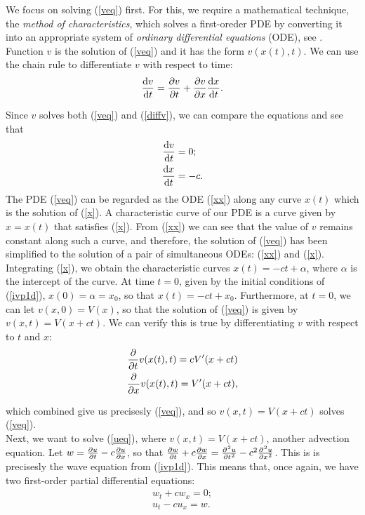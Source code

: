 \documentclass[a4paper, 12pt]{article}
\numberwithin{equation}{section}
\begin{document}
We focus on solving (\ref{veq}) first. For this, we require a mathematical
technique, the \emph{method of characteristics}, which solves a first-oreder PDE by
converting it into an appropriate system of \emph{ordinary differential equations}
(ODE), see \cite[Ch. 2.1, Ch. 3.2]{Ev}. Function $v$ is the solution of
(\ref{veq}) and it has the form $v(x(t), t)$. We can use the chain rule to
differentiate $v$ with respect to time:
\begin{equation} \label{diffv}
    \diff{v}{t}=\diffp[1]{v}{t}+\diffp[1]{v}{x}\diff{x}{t}.
\end{equation}

Since $v$ solves both (\ref{veq}) and (\ref{diffv}), we can compare the
equations and see that
\begin{align}
    \diff{v}{t}&=0 \label{xx};\\
    \diff{x}{t}&=-c \label{x}.
\end{align}
The PDE (\ref{veq}) can be regarded as the ODE (\ref{xx}) along any curve
$x(t)$ which is the solution of (\ref{x}). A characteristic curve of our PDE is
a curve given by $x=x(t)$ that satisfies (\ref{x}). From (\ref{xx}) we can see
that the value of $v$ remains constant along such a curve, and therefore, the
solution of (\ref{veq}) has been simplified to the solution of a pair of
simultaneous ODEs: (\ref{xx}) and (\ref{x}). Integrating (\ref{x}), we obtain
the characteristic curves $x(t)=-ct+\alpha$, where $\alpha$ is the intercept of
the curve. At time $t=0$, given by the initial conditions of (\ref{ivp1d}),
$x(0)=\alpha=x_0$, so that $x(t)=-ct+x_0$. Furthermore, at $t=0$, we can let
$v(x,0)=V(x)$, so that the solution of (\ref{veq}) is given by $v(x,t)=V(x+ct)$.
We can verify this is true by differentiating $v$ with respect to $t$ and $x$:
\begin{equation*} 
    \begin{aligned}
    \diffp[1]{}{t}v(x(t), t)=cV'(x+ct)\\
    \diffp[1]{}{x}v(x(t), t)=V'(x+ct),
    \end{aligned}
\end{equation*}

which combined give us precisesly (\ref{veq}), and so $v(x,t)=V(x+ct)$ solves
(\ref{veq}). \\

Next, we want to solve (\ref{ueq}), where $v(x,t)=V(x+ct)$, another advection
equation. Let $w=\diffp[1]{u}{t}-c\diffp{u}{x}$, so that
$\diffp[1]{w}{t}+c\diffp{w}{x}=\diffp[2]{u}{t}-c^2\diffp[2]{u}{x}$. This is is
precisesly the wave equation from (\ref{ivp1d}). This means that, once again, we
have two first-order partial differential equations:
\begin{align}
    \label{weq}
    w_t+cw_x=0;\\
    \label{ueqw}
    u_t-cu_x=w.
\end{align}
\end{document}
